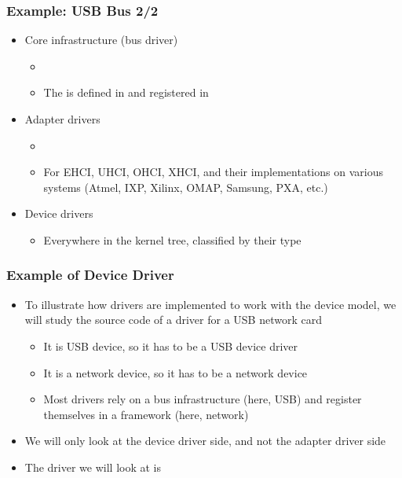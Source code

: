 \begin{frame}
  \frametitle{Example: USB Bus 2/2}
  \begin{itemize}
  \item Core infrastructure (bus driver)
    \begin{itemize}
    \item {}
    \item The  is defined in
       and registered in
    \end{itemize}
  \item Adapter drivers
    \begin{itemize}
    \item {}
    \item For EHCI, UHCI, OHCI, XHCI, and their implementations on
      various systems (Atmel, IXP, Xilinx, OMAP, Samsung, PXA, etc.)
    \end{itemize}
  \item Device drivers
    \begin{itemize}
    \item Everywhere in the kernel tree, classified by their type
    \end{itemize}
  \end{itemize}
\end{frame}

\begin{frame}
  \frametitle{Example of Device Driver}
  \begin{itemize}
  \item To illustrate how drivers are implemented to work with the
    device model, we will study the source code of a driver for a USB
    network card
    \begin{itemize}
    \item It is USB device, so it has to be a USB device driver
    \item It is a network device, so it has to be a network device
    \item Most drivers rely on a bus infrastructure (here, USB) and
      register themselves in a framework (here, network)
    \end{itemize}
  \item We will only look at the device driver side, and not the
    adapter driver side
  \item The driver we will look at is 
  \end{itemize}
\end{frame}

